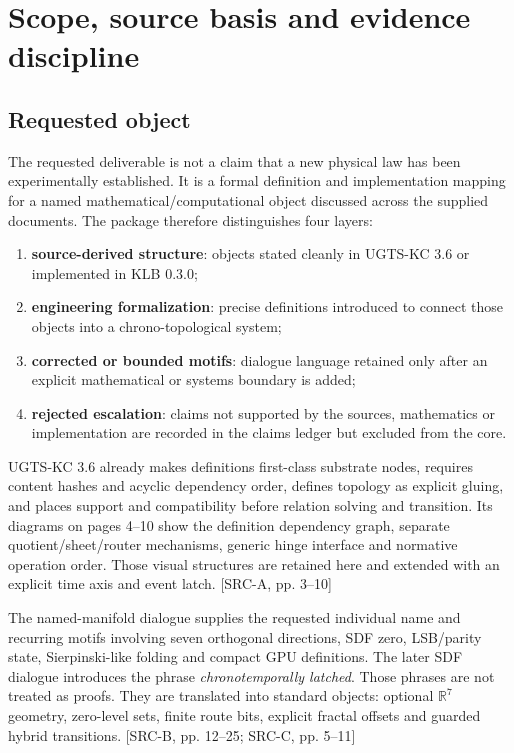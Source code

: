 \documentclass[10pt,a4paper]{article}
\newcommand{\Real}{\mathbb{R}}
\newcommand{\source}[1]{\textsf{\color{TKgray}[#1]}}
\begin{document}
\tableofcontents
\clearpage
{}

\section{Scope, source basis and evidence discipline}
\label{sec:scope}

\subsection{Requested object}

The requested deliverable is not a claim that a new physical law has been experimentally established. It is a formal definition and implementation mapping for a named mathematical/computational object discussed across the supplied documents. The package therefore distinguishes four layers:

\begin{enumerate}
  \item \textbf{source-derived structure}: objects stated cleanly in UGTS-KC 3.6 or implemented in KLB 0.3.0;
  \item \textbf{engineering formalization}: precise definitions introduced to connect those objects into a chrono-topological system;
  \item \textbf{corrected or bounded motifs}: dialogue language retained only after an explicit mathematical or systems boundary is added;
  \item \textbf{rejected escalation}: claims not supported by the sources, mathematics or implementation are recorded in the claims ledger but excluded from the core.
\end{enumerate}

UGTS-KC 3.6 already makes definitions first-class substrate nodes, requires content hashes and acyclic dependency order, defines topology as explicit gluing, and places support and compatibility before relation solving and transition. Its diagrams on pages 4--10 show the definition dependency graph, separate quotient/sheet/router mechanisms, generic hinge interface and normative operation order. Those visual structures are retained here and extended with an explicit time axis and event latch. \source{SRC-A, pp. 3--10}

The named-manifold dialogue supplies the requested individual name and recurring motifs involving seven orthogonal directions, SDF zero, LSB/parity state, Sierpinski-like folding and compact GPU definitions. The later SDF dialogue introduces the phrase \emph{chronotemporally latched}. Those phrases are not treated as proofs. They are translated into standard objects: optional \(\Real^7\) geometry, zero-level sets, finite route bits, explicit fractal offsets and guarded hybrid transitions. \source{SRC-B, pp. 12--25; SRC-C, pp. 5--11}
\end{document}

